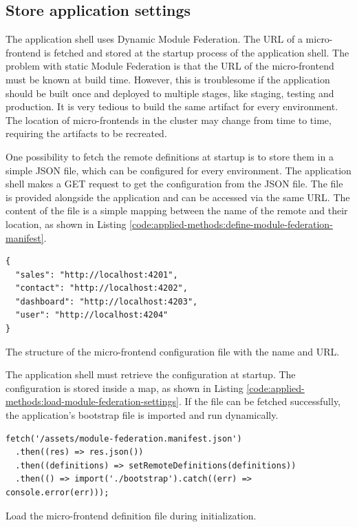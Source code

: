\subsection{Store application settings}\label{subsection:applied-methods:prototypical-implementation
:load-remote-settings}

The application shell uses Dynamic Module Federation. The \ac{URL} of a micro-frontend is fetched and stored at the startup process of the application shell. The problem with static Module Federation is that the \ac{URL} of the micro-frontend must be known at build time. However, this is troublesome if the application should be built once and deployed to multiple stages, like staging, testing and production. It is very tedious to build the same artifact for every environment. The location of micro-frontends in the cluster may change from time to time, requiring the artifacts to be recreated.

\bigskip

\noindent One possibility to fetch the remote definitions at startup is to store them in a simple \ac{JSON} file, which can be configured for every environment. The application shell makes a GET request to get the configuration from the \ac{JSON} file. The file is provided alongside the application and can be accessed via the same \ac{URL}. The content of the file is a simple mapping between the name of the remote and their location, as shown in Listing \ref{code:applied-methods:define-module-federation-manifest}.

\ifshowListings
\begin{listing}[H]
\begin{verbatim}
{
  "sales": "http://localhost:4201",
  "contact": "http://localhost:4202",
  "dashboard": "http://localhost:4203",
  "user": "http://localhost:4204"
}
\end{verbatim}
\caption{The structure of the micro-frontend configuration file with the name and \ac{URL}.}\label{code:applied-methods:define-module-federation-manifest}
\end{listing}
\fi

\noindent The application shell must retrieve the configuration at startup. The configuration is stored inside a map, as shown in Listing \ref{code:applied-methods:load-module-federation-settings}. If the file can be fetched successfully, the application's bootstrap file is imported and run dynamically.

\ifshowListings
\begin{listing}[H]
\begin{verbatim}
fetch('/assets/module-federation.manifest.json')
  .then((res) => res.json())
  .then((definitions) => setRemoteDefinitions(definitions))
  .then(() => import('./bootstrap').catch((err) => console.error(err)));
\end{verbatim}
\caption{Load the micro-frontend definition file during initialization.}\label{code:applied-methods:load-module-federation-settings}
\end{listing}
\fi

